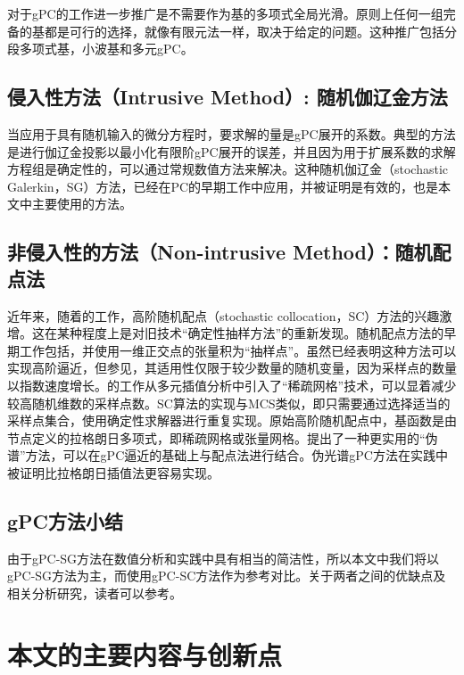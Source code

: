 对于gPC的工作进一步推广是不需要作为基的多项式全局光滑。原则上任何一组完备的基都是可行的选择，就像有限元法一样，取决于给定的问题。这种推广包括分段多项式基，小波基和多元gPC。

\subsection{侵入性方法（Intrusive Method）: 随机伽辽金方法}

当应用于具有随机输入的微分方程时，要求解的量是gPC展开的系数。典型的方法是进行伽辽金投影以最小化有限阶gPC展开的误差，并且因为用于扩展系数的求解方程组是确定性的，可以通过常规数值方法来解决。这种随机伽辽金（stochastic Galerkin，SG）方法，已经在PC的早期工作中应用，并被证明是有效的，也是本文中主要使用的方法。

\subsection{非侵入性的方法（Non-intrusive Method）：随机配点法}

近年来，随着的工作，高阶随机配点（stochastic collocation，SC）方法的兴趣激增。这在某种程度上是对旧技术“确定性抽样方法”的重新发现。随机配点方法的早期工作包括，并使用一维正交点的张量积为“抽样点”。虽然已经表明这种方法可以实现高阶逼近，但参见，其适用性仅限于较少数量的随机变量，因为采样点的数量以指数速度增长。的工作从多元插值分析中引入了“稀疏网格”技术，可以显着减少较高随机维数的采样点数。SC算法的实现与MCS类似，即只需要通过选择适当的采样点集合，使用确定性求解器进行重复实现。原始高阶随机配点中，基函数是由节点定义的拉格朗日多项式，即稀疏网格或张量网格。提出了一种更实用的“伪谱”方法，可以在gPC逼近的基础上与配点法进行结合。伪光谱gPC方法在实践中被证明比拉格朗日插值法更容易实现。

\subsection{gPC方法小结}

由于gPC-SG方法在数值分析和实践中具有相当的简洁性，所以本文中我们将以gPC-SG方法为主，而使用gPC-SC方法作为参考对比。关于两者之间的优缺点及相关分析研究，读者可以参考。


\section{本文的主要内容与创新点}


